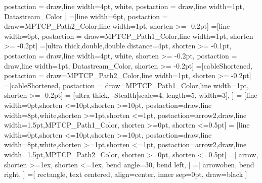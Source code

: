 	postaction = {draw,line width=4pt, white},%
	postaction = {draw,line width=1pt, Datastream_Color}
]%
=[line width=6pt,%
	postaction = {draw=MPTCP_Path2_Color,line width=1pt, shorten >= -0.2pt}]%
=[line width=6pt,%
	postaction = {draw=MPTCP_Path1_Color,line width=1pt, shorten >= -0.2pt}]%
%
=[ultra thick,double,double distance=4pt,%
	shorten >= -0.1pt,%
	postaction = {draw,line width=4pt, white, shorten >= -0.2pt},%
	postaction = {draw,line width=1pt, Datastream_Color, shorten >= -0.2pt}]%
=[cableShortened,%
	postaction = {draw=MPTCP_Path2_Color,line width=1pt, shorten >= -0.2pt}]%
=[cableShortened,%
	postaction = {draw=MPTCP_Path1_Color,line width=1pt, shorten >= -0.2pt}]%
%
%
 = [ultra thick,%
	-{Stealth[scale=4,%
	length=5,%
	width=3]},%
]%
 = [line width=0pt,shorten <=10pt,shorten >=10pt,%
	postaction={draw,line width=8pt,white,shorten >=1pt,shorten <=1pt},%
	postaction={arrow2,draw,line width=1.5pt,MPTCP_Path1_Color,%
	shorten >=0pt,%
	shorten <=0.5pt}]%
 = [line width=0pt,shorten <=10pt,shorten >=10pt,%
	postaction={draw,line width=8pt,white,shorten >=1pt,shorten <=1pt},%
	postaction={arrow2,draw,line width=1.5pt,MPTCP_Path2_Color,%
	shorten >=0pt,%
	shorten <=0.5pt}]%
%
%
%
%
=[%
	arrow,%
	shorten >=1ex,%
	shorten <=1ex,%
	bend angle=30,%
	bend left,%
]%
=[%
	arrowoben,%
	bend right,%
]%
%
%
%
%
%
%
=[
	rectangle,
	text centered,
	align=center,
	inner sep=0pt,%
	draw=black
]%
%
%
%
%